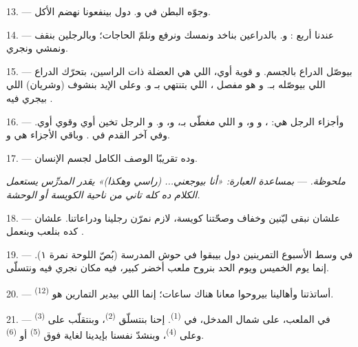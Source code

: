 13. --- وجوّه البطن في  و. دول بينفعونا نهضم
الأكل.

\VUsaut{4.4mm}
\VUsaut{3.0mm}

14. --- عندنا أربع :  و. بالدراعين
بناخد ونمسك ونرفع ونلمّ الحاجات؛ وبالرجلين بنقف ونمشي ونجري.

15. ---  بيوصّل الدراع بالجسم. و قوية أوي، اللي هي
العضلة ذات الراسين، بتحرّك الدراع اللي  بيوصّله
بـ. و هو مفصل ، اللي بتنتهي
بـ و. وعلى الإيد بنشوف  (وشريان)
اللي بيجري فيه .

16. --- وأجزاء الرجل هي: ، و و، و اللي  مغطّى بـ،
و، و. و الرجل تخين أوي وقوي أوي. وفي
آخر القدم في . وباقي الأجزاء هي 
و.

17. --- وده تقريبًا الوصف الكامل لجسم الإنسان.

\textit{ملحوظة.} --- \textit{بمساعدة العبارة: «أنا بيوجعني... (راسي وهكذا)»
يقدر المدرِّس يستعمل الكلام ده كله تاني من ناحية} 
\textit{الكويسة أو الوحشة.}

\VUsaut{5.0mm}
\VUsaut{2.4mm}
\VUsaut{3.0mm}

18. --- علشان نبقى ليّنين وخفاف وصحّتنا كويسة، لازم نمرّن رجلينا ودراعاتنا.
علشان كده بنلعب وبنعمل .

19. --- في وسط الأسبوع التمرينين دول بيبقوا في حوش المدرسة (بُصّ اللوحة نمرة
١). إنما يوم الخميس ويوم الحد بنروح ملعب أخضر كبير، فيه مكان نجري فيه ونتسلّى.

20. --- أساتذتنا وأهالينا بيروحوا معانا هناك ساعات؛ إنما اللي بيدير التمارين
هو \textsuperscript{(12)}.

21. --- في الملعب، على شمال المدخل، في \textsuperscript{(1)}.
إحنا بنتسلّق \textsuperscript{(2)}، وبنتقلّب على
\textsuperscript{(3)} وعلى \textsuperscript{(4)}، وبنشدّ نفسنا بإيدينا لغاية فوق
\textsuperscript{(5)} أو \textsuperscript{(6)}.

